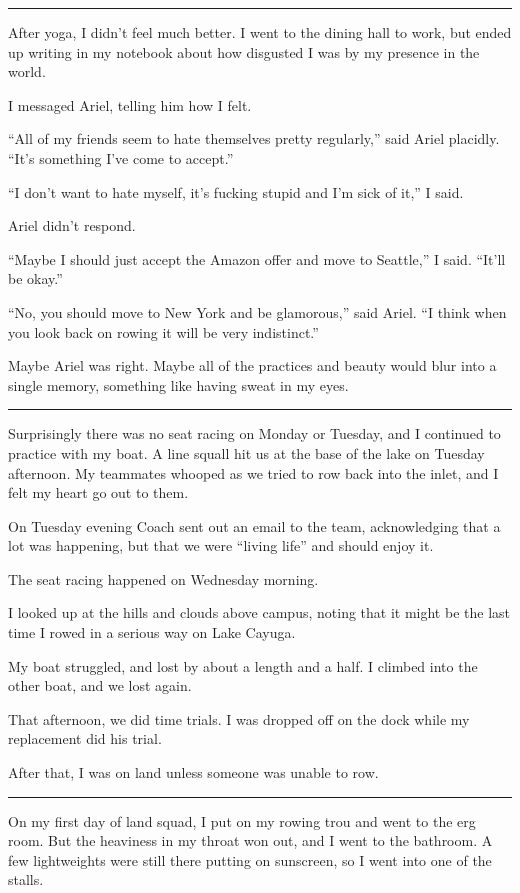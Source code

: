 \plainfancybreak{12pt}{2}{}

After yoga, I didn't feel much better.  I went to the dining hall to work, but
ended up writing in my notebook about how disgusted I was by my presence in the
world.

I messaged Ariel, telling him how I felt.

``All of my friends seem to hate themselves pretty regularly,'' said Ariel
placidly.  ``It's something I've come to accept.''

``I don't want to hate myself, it's fucking stupid and I'm sick of it,'' I said.

Ariel didn't respond.

``Maybe I should just accept the Amazon offer and move to Seattle,'' I said.
``It'll be okay.''

``No, you should move to New York and be glamorous,'' said Ariel.  ``I think
when you look back on rowing it will be very indistinct.''

Maybe Ariel was right.  Maybe all of the practices and beauty would blur into a
single memory, something like having sweat in my eyes.

\plainfancybreak{12pt}{2}{}

Surprisingly there was no seat racing on Monday or Tuesday, and I continued to
practice with my boat.  A line squall hit us at the base of the lake on Tuesday
afternoon.  My teammates whooped as we tried to row back into the inlet, and I
felt my heart go out to them.

On Tuesday evening Coach sent out an email to the team, acknowledging that a lot
was happening, but that we were ``living life'' and should enjoy it.

The seat racing happened on Wednesday morning.

I looked up at the hills and clouds above campus, noting that it might be the
last time I rowed in a serious way on Lake Cayuga.

My boat struggled, and lost by about a length and a half.  I climbed into the
other boat, and we lost again.

That afternoon, we did time trials.  I was dropped off on the dock while my
replacement did his trial.

After that, I was on land unless someone was unable to row.

\plainfancybreak{12pt}{2}{}

On my first day of land squad, I put on my rowing trou and went to the erg room.
But the heaviness in my throat won out, and I went to the bathroom.  A few
lightweights were still there putting on sunscreen, so I went into one of the
stalls.

